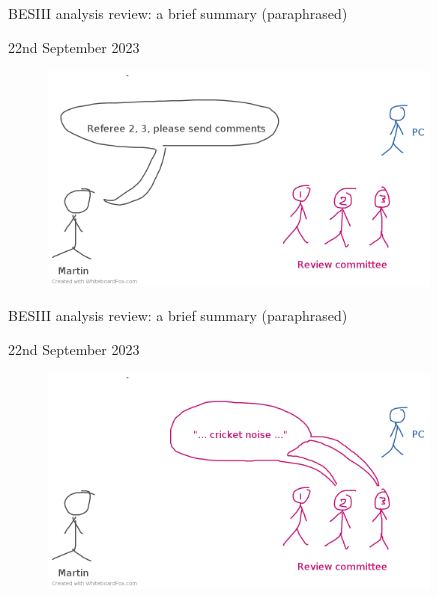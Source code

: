 \documentclass{beamer}
\begin{document}
\begin{frame}{BESIII analysis review: a brief summary (paraphrased)}
  \begin{center}
    {\large 22nd September 2023}
  \end{center}
  \begin{figure}
    \includegraphics[width=0.9\textwidth,trim={0 0 0 0.5cm},clip=true]{Plots/BESIII_review_process_3.png}
  \end{figure}
\end{frame}

\begin{frame}{BESIII analysis review: a brief summary (paraphrased)}
  \begin{center}
    {\large 22nd September 2023}
  \end{center}
  \begin{figure}
    \includegraphics[width=0.9\textwidth,trim={0 0 0 0.5cm},clip=true]{Plots/BESIII_review_process_4.png}
  \end{figure}
\end{frame}
\end{document}
